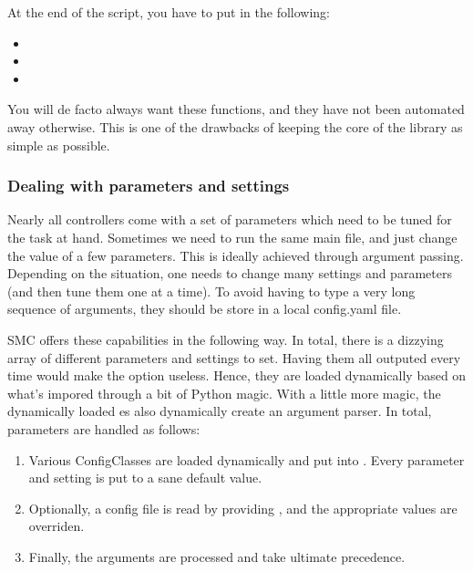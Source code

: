 At the end of the script, you have to put in the following:
\begin{itemize}
		\item {} 
		\item {} 
		\item {} 
\end{itemize}
You will de facto always want these functions, and they have not been automated away otherwise.
This is one of the drawbacks of keeping the core of the library as simple as possible.

\subsubsection{Dealing with parameters and settings}
Nearly all controllers come with a set of parameters which need to be
tuned for the task at hand.
Sometimes we need to run the same main file, and just change
the value of a few parameters.
This is ideally achieved through argument passing.
Depending on the situation, one needs to change many settings
and parameters (and then tune them one at a time).
To avoid having to type a very long sequence of arguments,
they should be store in a local config.yaml file.

SMC offers these capabilities in the following way.
In total, there is a dizzying array of different parameters
and settings to set. Having them all outputed every time
would make the  option useless.
Hence, they are loaded dynamically based on what's impored
through a bit of Python magic.
With a little more magic, the dynamically loaded 
es also dynamically create an argument
parser.
In total, parameters are handled as follows:
\begin{enumerate}
\item Various ConfigClasses are loaded dynamically and
	put into . Every parameter
	and setting is put to a sane default value.
\item Optionally, a config file is read by providing
	,
	and the appropriate values are overriden.
\item Finally, the arguments are processed and take ultimate
	precedence.
\end{enumerate}

